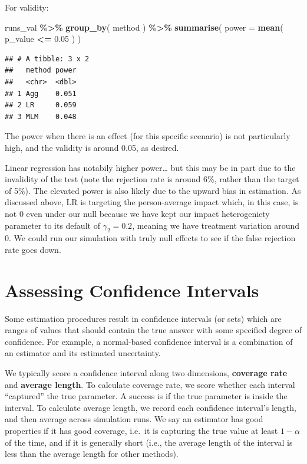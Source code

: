 \documentclass[
]{book}
\newenvironment{Shaded}{\begin{snugshade}}{\end{snugshade}}
\newcommand{\AttributeTok}[1]{\textcolor[rgb]{0.13,0.29,0.53}{#1}}
\newcommand{\FloatTok}[1]{\textcolor[rgb]{0.00,0.00,0.81}{#1}}
\newcommand{\FunctionTok}[1]{\textcolor[rgb]{0.13,0.29,0.53}{\textbf{#1}}}
\newcommand{\NormalTok}[1]{#1}
\newcommand{\SpecialCharTok}[1]{\textcolor[rgb]{0.81,0.36,0.00}{\textbf{#1}}}
\begin{document}
For validity:

\begin{Shaded}
\begin{Highlighting}[]
\NormalTok{runs\_val }\SpecialCharTok{\%\textgreater{}\%} \FunctionTok{group\_by}\NormalTok{( method ) }\SpecialCharTok{\%\textgreater{}\%}
  \FunctionTok{summarise}\NormalTok{( }\AttributeTok{power =} \FunctionTok{mean}\NormalTok{( p\_value }\SpecialCharTok{\textless{}=} \FloatTok{0.05}\NormalTok{ ) )}
\end{Highlighting}
\end{Shaded}

\begin{verbatim}
## # A tibble: 3 x 2
##   method power
##   <chr>  <dbl>
## 1 Agg    0.051
## 2 LR     0.059
## 3 MLM    0.048
\end{verbatim}

The power when there is an effect (for this specific scenario) is not particularly high, and the validity is around 0.05, as desired.

Linear regression has notabily higher power\ldots{} but this may be in part due to the invalidity of the test (note the rejection rate is around 6\%, rather than the target of 5\%).
The elevated power is also likely due to the upward bias in estimation.
As discussed above, LR is targeting the person-average impact which, in this case, is not 0 even under our null because we have kept our impact heterogeniety parameter to its default of \(\gamma_2=0.2\), meaning we have treatment variation around 0.
We could run our simulation with truly null effects to see if the false rejection rate goes down.

\section{Assessing Confidence Intervals}\label{assessing-confidence-intervals}

Some estimation procedures result in confidence intervals (or sets) which are ranges of values that should contain the true answer with some specified degree of confidence.
For example, a normal-based confidence interval is a combination of an estimator and its estimated uncertainty.

We typically score a confidence interval along two dimensions, \textbf{coverage rate} and \textbf{average length}.
To calculate coverage rate, we score whether each interval ``captured'' the true parameter.
A success is if the true parameter is inside the interval.
To calculate average length, we record each confidence interval's length, and then average across simulation runs.
We say an estimator has good properties if it has good coverage, i.e.~it is capturing the true value at least \(1-\alpha\) of the time, and if it is generally short (i.e., the average length of the interval is less than the average length for other methods).
\end{document}
